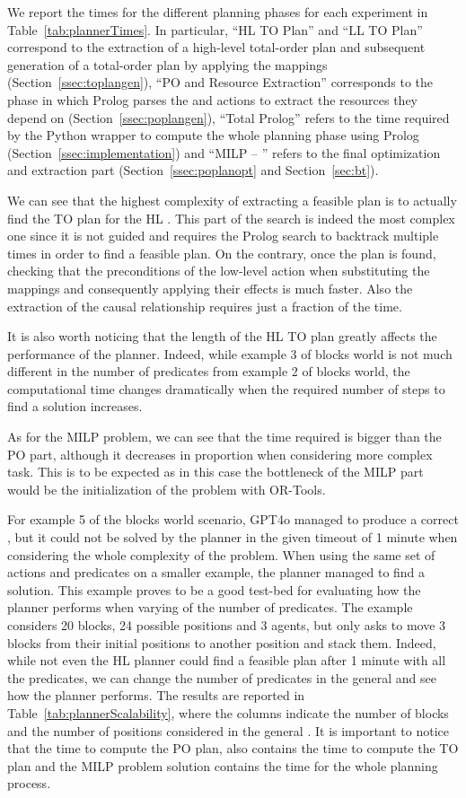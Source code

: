 We report the times for the different planning phases for each experiment in Table~\ref{tab:plannerTimes}. In particular, ``HL TO Plan'' and ``LL TO Plan'' correspond to the extraction of a high-level total-order plan and subsequent generation of a total-order plan by applying the mappings (Section~\ref{ssec:toplangen}), ``PO and Resource Extraction'' corresponds to the phase in which Prolog parses the \kb and actions to extract the resources they depend on (Section~\ref{ssec:poplangen}), ``Total Prolog'' refers to the time required by the Python wrapper to compute the whole planning phase using Prolog (Section~\ref{ssec:implementation}) and ``MILP -- \bt'' refers to the final optimization and \bt extraction part (Section~\ref{ssec:poplanopt} and Section~\ref{sec:bt}).

We can see that the highest complexity of extracting a feasible plan is to actually find the TO plan for the HL \kb. This part of the search is indeed the most complex one since it is not guided and requires the Prolog search to backtrack multiple times in order to find a feasible plan. On the contrary, once the plan is found, checking that the preconditions of the low-level action when substituting the mappings and consequently applying their effects is much faster. Also the extraction of the causal relationship requires just a fraction of the time. 

It is also worth noticing that the length of the HL TO plan greatly affects the performance of the planner. Indeed, while example 3 of blocks world is not much different in the number of predicates from example 2 of blocks world, the computational time changes dramatically when the required number of steps to find a solution increases.

As for the MILP problem, we can see that the time required is bigger than the PO part, although it decreases in proportion when considering more complex task. This is to be expected as in this case the bottleneck of the MILP part would be the initialization of the problem with OR-Tools.

For example 5 of the blocks world scenario, GPT4o managed to produce a correct \kb, but it could not be solved by the planner in the given timeout of 1 minute when considering the whole complexity of the problem. When using the same set of actions and predicates on a smaller example, the planner managed to find a solution. This example proves to be a good test-bed for evaluating how the planner performs when varying of the number of predicates. The example considers 20 blocks, 24 possible positions and 3 agents, but only asks to move 3 blocks from their initial positions to another position and stack them. Indeed, while not even the HL planner could find a feasible plan after 1 minute with all the predicates, we can change the number of predicates in the general \kb and see how the planner performs. The results are reported in Table~\ref{tab:plannerScalability}, where the columns indicate the number of blocks and the number of positions considered in the general \kb. It is important to notice that the time to compute the PO plan, also contains the time to compute the TO plan and the MILP problem solution contains the time for the whole planning process.

